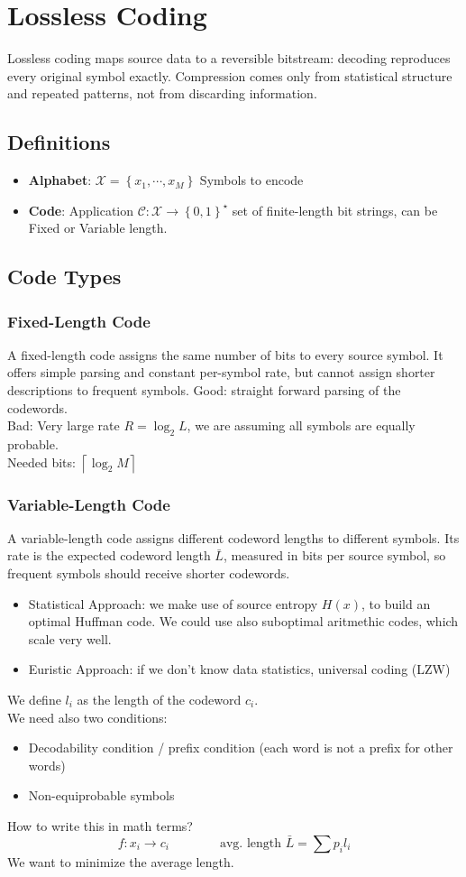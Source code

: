 \section{Lossless Coding}
Lossless coding maps source data to a reversible bitstream: decoding reproduces every original symbol exactly. Compression comes only from statistical structure and repeated patterns, not from discarding information.
\subsection{Definitions}
\begin{itemize}
    \item \textbf{Alphabet}: $\mathcal{X} = \left\{x_1, \cdots, x_M\right\}$ Symbols to encode
    \item \textbf{Code}: Application $\mathcal{C} : \mathcal{X} \to \left\{0,1\right\}^\star$ set of finite-length bit strings, can be Fixed or Variable length.
\end{itemize}
\subsection{Code Types}
\subsubsection{Fixed-Length Code}
A fixed-length code assigns the same number of bits to every source symbol. It offers simple parsing and constant per-symbol rate, but cannot assign shorter descriptions to frequent symbols.
Good: straight forward parsing of the codewords.\\
Bad: Very large rate $R = \log_2 L$, we are assuming all symbols are equally probable.\\
Needed bits: $\left\lceil \log_2 M \right\rceil$
\subsubsection{Variable-Length Code}
A variable-length code assigns different codeword lengths to different symbols. Its rate is the expected codeword length $\bar{L}$, measured in bits per source symbol, so frequent symbols should receive shorter codewords.
\begin{itemize}
    \item Statistical Approach: we make use of source entropy $H(x)$, to build an optimal Huffman code. We could use also suboptimal aritmethic codes, which scale very well.
    \item Euristic Approach: if we don't know data statistics, universal coding (LZW)
\end{itemize}
We define $l_i$ as the length of the codeword $c_i$.\\
We need also two conditions:
\begin{itemize}
    \item Decodability condition / prefix condition (each word is not a prefix for other words)
    \item Non-equiprobable symbols
\end{itemize}
How to write this in math terms?
$$f : x_i \to c_i \qquad \qquad \text{avg. length }\bar{L} = \sum p_i l_i$$
We want to minimize the average length.
